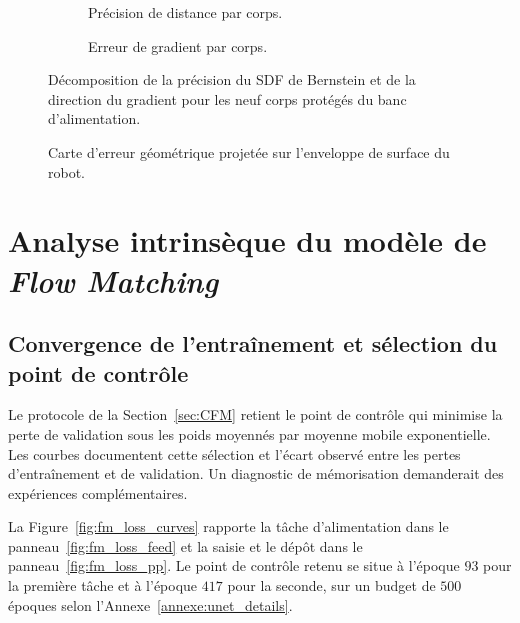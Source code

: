 \begin{figure}[!htbp]
    \centering
    \begin{subfigure}[b]{0.48\textwidth}
        \centering
        
        \caption{Précision de distance par corps.}\label{fig:per_link_distance}
    \end{subfigure}
    \hfill
    \begin{subfigure}[b]{0.48\textwidth}
        \centering
        
        \caption{Erreur de gradient par corps.}\label{fig:per_link_gradient}
    \end{subfigure}
    \caption[Décomposition de la précision du SDF par corps]{Décomposition de la précision du \ac{SDF} de Bernstein et de la direction du gradient pour les neuf corps protégés du banc d'alimentation.}\label{fig:sdf_per_link}
\end{figure}

\begin{figure}[!htbp]
    \centering
    
    \caption{Carte d'erreur géométrique projetée sur l'enveloppe de surface du robot.}\label{fig:surface_error_map}
\end{figure}

\section*{Analyse intrinsèque du modèle de \textit{Flow Matching}}

\subsection*{Convergence de l'entraînement et sélection du point de contrôle}

Le protocole de la Section~\ref{sec:CFM} retient le point de contrôle qui minimise la perte de validation sous les poids moyennés par moyenne mobile exponentielle. Les courbes documentent cette sélection et l'écart observé entre les pertes d'entraînement et de validation. Un diagnostic de mémorisation demanderait des expériences complémentaires.

La Figure~\ref{fig:fm_loss_curves} rapporte la tâche d'alimentation dans le panneau~\ref{fig:fm_loss_feed} et la saisie et le dépôt dans le panneau~\ref{fig:fm_loss_pp}. Le point de contrôle retenu se situe à l'époque $93$ pour la première tâche et à l'époque $417$ pour la seconde, sur un budget de $500$ époques selon l'Annexe~\ref{annexe:unet_details}.

